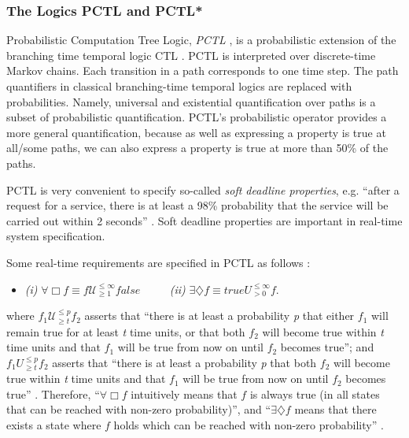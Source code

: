 \documentclass[11pt]{article}
\begin{document}
\subsubsection{The Logics PCTL and PCTL*}

Probabilistic Computation Tree Logic, \emph{PCTL} \cite{HJ89,HJ94}, is a probabilistic extension of the branching time temporal logic CTL \cite{CES86}. PCTL is interpreted over discrete-time Markov chains. Each transition in a path corresponds to one time step. The path quantifiers in classical branching-time temporal logics are replaced with probabilities. Namely, universal and existential quantification over paths is a subset of probabilistic quantification. PCTL's probabilistic operator provides a more general quantification, because as well as expressing a property is true at all/some paths, we can also express a property is true at more than 50\% of the paths. 

PCTL is very convenient to specify so-called \emph{soft deadline properties}, e.g. ``after a request for a service, there is at least a 98\% probability that the service will be carried out within 2 seconds'' \cite{HJ94}. Soft deadline properties are important in real-time system specification. 

Some real-time requirements are specified in PCTL as follows \cite{HJ94}:

\begin{itemize}
\item \emph{(i)} $\forall \Box f \equiv f\mathcal{U}_{\geq 1}^{\leq \infty} false$  $\qquad$ \emph{(ii)} $\exists \diamondsuit f \equiv true U_{> 0}^{\leq \infty} f$. 
\end{itemize}

\noindent where $f_{1} \mathcal{U}_{\geq t}^{\leq p} f_{2}$ asserts that ``there is at least a probability \emph{p} that either $f_{1}$ will remain true for at least \emph{t} time units, or that both $f_{2}$ will become true within \emph{t} time units and that $f_{1}$ will be true from now on until $f_{2}$ becomes true''; and $f_{1} U_{\geq t}^{\leq p} f_{2}$ asserts that ``there is at least a probability \emph{p} that both $f_{2}$ will become true within \emph{t} time units and that $f_{1}$ will be true from now on until $f_{2}$ becomes true'' \cite{HJ94}. Therefore, ``$\forall \Box f$ intuitively means that $f$ is always true (in all states that can be reached with non-zero probability)'', and ``$\exists \diamondsuit f$  means that there exists a state where $f$ holds which can be reached with non-zero probability'' \cite{HJ94}.
\end{document}
